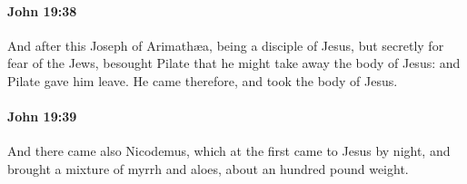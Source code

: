 		\paragraph{John 19:38} %
			\label{JOHN-19-38}

			And after this Joseph of Arimathæa, being a disciple of Jesus, but secretly for fear of the Jews, besought Pilate that he might take away the body of Jesus: and Pilate gave him leave. He came therefore, and took the body of Jesus.

			\begin{framed}
				\scriptsize
				\begin{compactdesc}
					\item[SBLG] 
				\end{compactdesc}
			\end{framed}

		\paragraph{John 19:39} %
			\label{JOHN-19-39}

			And there came also Nicodemus, which at the first came to Jesus by night, and brought a mixture of myrrh and aloes, about an hundred pound weight.

